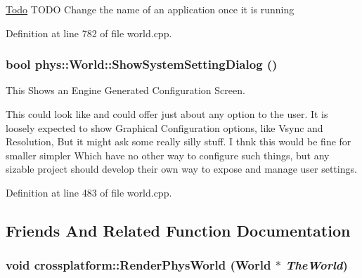 \begin{Desc}
\item[\hyperlink{todo__todo000023}{Todo}]TODO Change the name of an application once it is running \end{Desc}




Definition at line 782 of file world.cpp.

\hypertarget{classphys_1_1World_a0d8ce136bebe81a6826b7e202a531f6a}{
\subsubsection[{ShowSystemSettingDialog}]{\setlength{\rightskip}{0pt plus 5cm}bool phys::World::ShowSystemSettingDialog ()}}
\label{da/ddf/classphys_1_1World_a0d8ce136bebe81a6826b7e202a531f6a}


This Shows an Engine Generated Configuration Screen. 

This could look like and could offer just about any option to the user. It is loosely expected to show Graphical Configuration options, like Vsync and Resolution, But it might ask some really silly stuff. I thnk this would be fine for smaller simpler Which have no other way to configure such things, but any sizable project should develop their own way to expose and manage user settings. 

Definition at line 483 of file world.cpp.



\subsection{Friends And Related Function Documentation}
\hypertarget{classphys_1_1World_ac7946bdb41c7884bcd7cfdec2b5358f0}{
\subsubsection[{crossplatform::RenderPhysWorld}]{\setlength{\rightskip}{0pt plus 5cm}void crossplatform::RenderPhysWorld ({\bf World} $\ast$ {\em TheWorld})}}
\label{da/ddf/classphys_1_1World_ac7946bdb41c7884bcd7cfdec2b5358f0}



